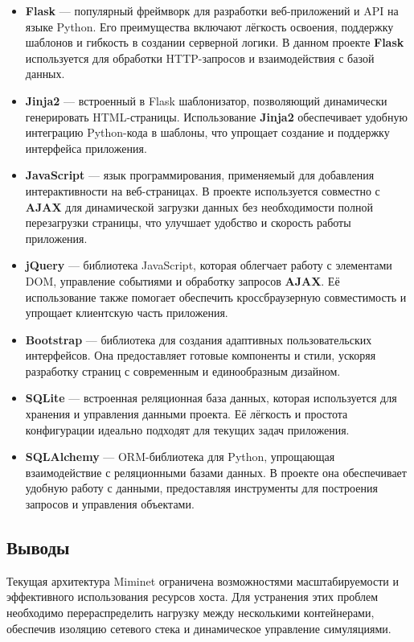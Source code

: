     \begin{itemize}
        \item \textbf{Flask} — популярный фреймворк для разработки веб-приложений и API на языке Python. Его преимущества включают лёгкость освоения, поддержку шаблонов и гибкость в создании серверной логики. В данном проекте \textbf{Flask} используется для обработки HTTP-запросов и взаимодействия с базой данных.
        \item \textbf{Jinja2} — встроенный в Flask шаблонизатор, позволяющий динамически генерировать HTML-страницы. Использование \textbf{Jinja2} обеспечивает удобную интеграцию Python-кода в шаблоны, что упрощает создание и поддержку интерфейса приложения.
        \item \textbf{JavaScript} — язык программирования, применяемый для добавления интерактивности на веб-страницах. В проекте используется совместно с \textbf{AJAX} для динамической загрузки данных без необходимости полной перезагрузки страницы, что улучшает удобство и скорость работы приложения.
        \item \textbf{jQuery} — библиотека JavaScript, которая облегчает работу с элементами DOM, управление событиями и обработку запросов \textbf{AJAX}. Её использование также помогает обеспечить кроссбраузерную совместимость и упрощает клиентскую часть приложения.
        \item \textbf{Bootstrap} — библиотека для создания адаптивных пользовательских интерфейсов. Она предоставляет готовые компоненты и стили, ускоряя разработку страниц с современным и единообразным дизайном.
        \item \textbf{SQLite} — встроенная реляционная база данных, которая используется для хранения и управления данными проекта. Её лёгкость и простота конфигурации идеально подходят для текущих задач приложения.
        \item \textbf{SQLAlchemy} — ORM-библиотека для Python, упрощающая взаимодействие с реляционными базами данных. В проекте она обеспечивает удобную работу с данными, предоставляя инструменты для построения запросов и управления объектами.
    \end{itemize}

\subsection{Выводы}

Текущая архитектура Miminet ограничена возможностями масштабируемости и эффективного использования ресурсов хоста.
Для устранения этих проблем необходимо перераспределить нагрузку между несколькими контейнерами, обеспечив изоляцию сетевого стека и динамическое управление симуляциями.
